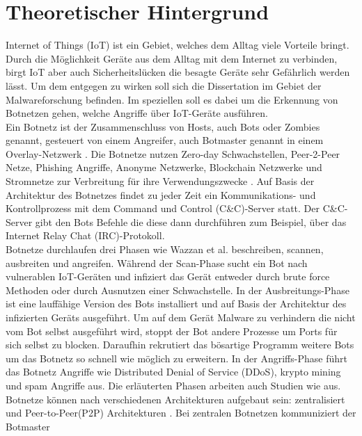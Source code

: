 \section{Theoretischer Hintergrund}
\label{sec:theory}

Internet of Things (IoT) ist ein Gebiet, welches dem Alltag viele Vorteile bringt. Durch die Möglichkeit
Geräte aus dem Alltag mit dem Internet zu verbinden, birgt IoT aber auch Sicherheitslücken die besagte Geräte sehr Gefährlich
werden lässt. Um dem entgegen zu wirken soll sich die Dissertation im Gebiet der Malwareforschung befinden. Im speziellen soll es dabei um 
die Erkennung von Botnetzen gehen, welche Angriffe über IoT-Geräte ausführen. \\ Ein Botnetz ist der Zusammenschluss von Hosts, auch Bots oder Zombies genannt, gesteuert von einem Angreifer, 
auch Botmaster genannt in einem Overlay-Netzwerk \cite{Xing2021SurveyOB}. Die Botnetze nutzen Zero-day Schwachstellen, Peer-2-Peer Netze, Phishing Angriffe, Anonyme Netzwerke,
Blockchain Netzwerke und Stromnetze zur Verbreitung für ihre Verwendungszwecke \cite{DBLP:conf/cycon/CasenoveM14,DBLP:conf/esorics/KurtECAU20}. Auf Basis der Architektur 
des Botnetzes findet zu jeder Zeit ein Kommunikations- und Kontrollprozess mit dem Command und Control (C\&C)-Server statt. Der C\&C-Server gibt den Bots Befehle die 
diese dann durchführen \cite{SCHILLER200729} zum Beispiel, über das Internet Relay Chat (IRC)-Protokoll. \\ Botnetze durchlaufen drei Phasen wie Wazzan et al. 
\cite{Wazzan2021InternetOT} beschreiben, scannen, ausbreiten und angreifen. Während der Scan-Phase sucht ein Bot nach vulnerablen IoT-Geräten und 
infiziert das Gerät entweder durch brute force Methoden oder durch Ausnutzen einer Schwachstelle.
In der Ausbreitungs-Phase ist eine lauffähige Version des Bots installiert und auf Basis der Architektur des infizierten Geräts ausgeführt.
Um auf dem Gerät Malware zu verhindern die nicht vom Bot selbst ausgeführt wird, stoppt der Bot andere Prozesse um Ports für sich selbst zu blocken. 
Daraufhin rekrutiert das bösartige Programm weitere Bots um das Botnetz so schnell wie möglich zu erweitern. In der Angriffs-Phase führt das Botnetz Angriffe wie Distributed Denial of 
Service (DDoS), krypto mining und spam Angriffe aus. Die erläuterten Phasen arbeiten auch Studien wie \cite{10.1007/978-3-030-33229-7_21, Alzahrani2020,DBLP:journals/computer/VlajicZ18,NGUYEN2020128} 
aus. Botnetze können nach verschiedenen Architekturen aufgebaut sein: zentralisiert und Peer-to-Peer(P2P) Architekturen \cite{DBLP:journals/fi/VuSEBD21}. Bei zentralen Botnetzen kommuniziert der Botmaster
